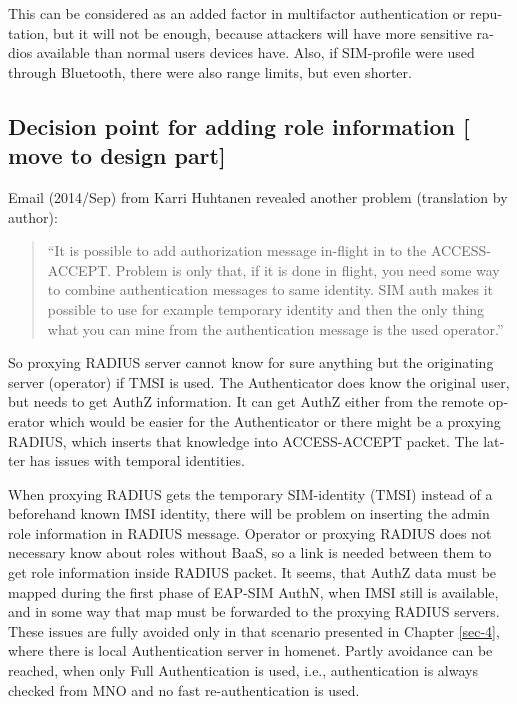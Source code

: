 \documentclass[12pt,a4paper,english]{tutthesis}
\begin{document}
\begin{otherlanguage}{english}
This can be considered as an added factor in multifactor
authentication or reputation, but it will not be enough, because
attackers will have more sensitive  radios available than normal users
devices have. 
Also, if SIM-profile were used through Bluetooth, there were also
range limits, but even shorter.


\subsection{Decision point for adding role information [ move to design part]}
\label{sec-6-5-7}













Email (2014/Sep) from Karri Huhtanen revealed another
problem (translation by author):
\begin{quote}
``It is possible to add authorization message in-flight in to the
ACCESS-ACCEPT.
Problem is only that, if it is done in flight, you need some way to
combine authentication messages to same identity. SIM auth makes it
possible to use for example temporary identity and then the only thing
what you can mine from the authentication message is the used operator.''
\end{quote}

So proxying RADIUS server cannot know for sure anything but the
originating server (operator) if TMSI is used. The Authenticator does
know the original user, but needs to get AuthZ information. It can get
AuthZ either from the remote operator which would be easier for the
Authenticator or there might be a proxying RADIUS, which inserts that
knowledge into ACCESS-ACCEPT packet. The latter has issues with
temporal identities. 






When proxying RADIUS gets the temporary SIM-identity (TMSI) instead of
a beforehand known IMSI identity, there will be problem
on inserting the admin role information in RADIUS message.
Operator or proxying RADIUS 
does not necessary know about roles without BaaS, so a link
is needed between them to get role information inside RADIUS packet.
It seems, that AuthZ data must be mapped during the first phase of
EAP-SIM AuthN, when IMSI still is available, and in some way
that map must be forwarded to the proxying RADIUS servers.
These issues are fully avoided only in that scenario presented in Chapter
\ref{sec-4}, where there is local Authentication server in homenet.
Partly avoidance can be reached, when only Full Authentication is
used, i.e., authentication is always checked from MNO and no fast
re-authentication is used.


\end{otherlanguage}
\end{document}
